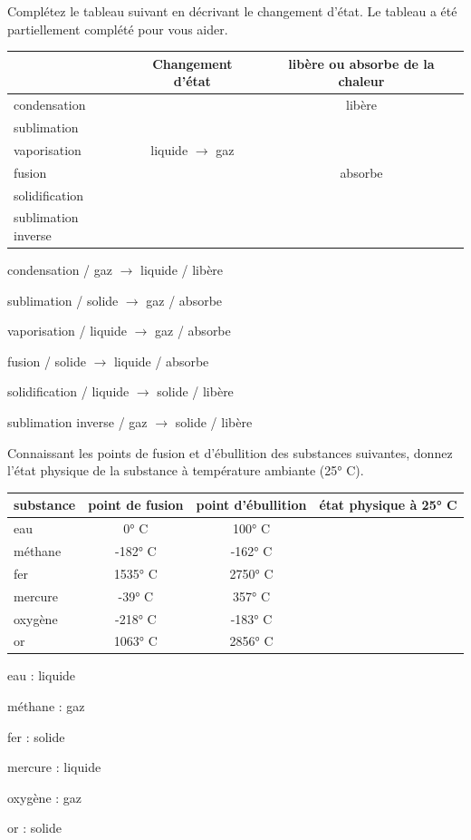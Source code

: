 \documentclass[
  11pt,
  french,
  a4paper,
  openany]{book}
\begin{document}
\begin{Exercise}
Complétez le tableau suivant en décrivant le changement d'état. Le tableau a été partiellement complété pour vous aider.

\end{Exercise}

\begin{longtable}[]{@{}lcc@{}}
\toprule
& Changement d'état & libère ou absorbe de la chaleur\tabularnewline
\midrule
\endhead
condensation & & libère\tabularnewline
sublimation & &\tabularnewline
vaporisation & liquide \(\rightarrow\) gaz &\tabularnewline
fusion & & absorbe\tabularnewline
solidification & &\tabularnewline
sublimation inverse & &\tabularnewline
\bottomrule
\end{longtable}

\begin{Answer}
condensation / gaz \(\rightarrow\) liquide / libère

sublimation / solide \(\rightarrow\) gaz / absorbe

vaporisation / liquide \(\rightarrow\) gaz / absorbe

fusion / solide \(\rightarrow\) liquide / absorbe

solidification / liquide \(\rightarrow\) solide / libère

sublimation inverse / gaz \(\rightarrow\) solide / libère

\end{Answer}

\begin{Exercise}
Connaissant les points de fusion et d'ébullition des substances suivantes, donnez l'état physique de la substance à température ambiante (25° C).

\end{Exercise}

\begin{longtable}[]{@{}lccc@{}}
\toprule
substance & point de fusion & point d'ébullition & état physique à 25° C\tabularnewline
\midrule
\endhead
eau & 0° C & 100° C &\tabularnewline
méthane & -182° C & -162° C &\tabularnewline
fer & 1535° C & 2750° C &\tabularnewline
mercure & -39° C & 357° C &\tabularnewline
oxygène & -218° C & -183° C &\tabularnewline
or & 1063° C & 2856° C &\tabularnewline
\bottomrule
\end{longtable}

\begin{Answer}
eau : liquide

méthane : gaz

fer : solide

mercure : liquide

oxygène : gaz

or : solide

\end{Answer}
\end{document}
